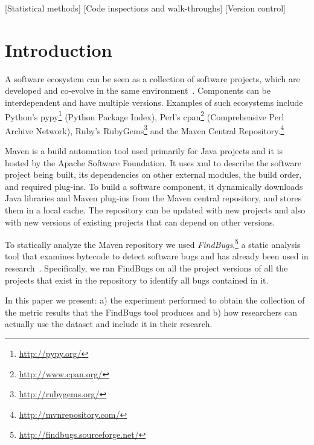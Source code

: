 \documentclass{sig-alternate}
\begin{document}
[Statistical methods]
[Code inspections and walk-throughs]
[Version control]



\section{Introduction}
\label{sec:intro}

A software ecosystem can be seen as a collection of software projects,
which are developed and co-evolve in the same environment~\cite{LL10}.
Components can be interdependent and have multiple versions.
Examples of such ecosystems include Python's
{\sc p}y{\sc py}\footnote{\url{http://pypy.org/}}
(Python Package Index), Perl's
{\sc cpan}\footnote{\url{http://www.cpan.org/}}
(Comprehensive Perl Archive Network), Ruby's
RubyGems\footnote{\url{http://rubygems.org/}}
and the Maven Central Repository.\footnote{\url{http://mvnrepository.com/}}

Maven is a build automation tool used primarily for Java projects and it is
hosted by the Apache Software Foundation.
It uses {\sc xml} to describe the software project being built, its dependencies
on other external modules, the build order, and required plug-ins.
To build a software component, it dynamically downloads Java libraries
and Maven plug-ins from the Maven central repository,
and stores them in a local cache. The repository can be updated with
new projects and also with new versions of existing projects
that can depend on other versions.

To statically analyze the Maven repository
we used {\it FindBugs},\footnote{\url{http://findbugs.sourceforge.net/}}
a static analysis tool that examines bytecode to detect software bugs
and has already been used in research~\cite{AP10,SHP06}.
Specifically, we ran FindBugs on all the project versions of all
the projects that exist in the repository
to identify all bugs contained in it.

In this paper we present: a) the experiment performed to obtain the
collection of the metric results that the FindBugs tool produces and
b) how researchers can actually use the dataset and include it in
their research.
\end{document}

